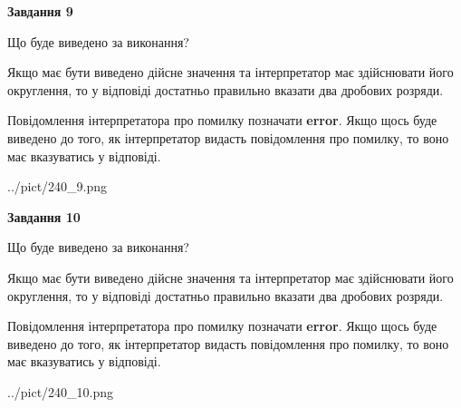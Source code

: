 \documentclass[12pt, ukrainian]{article}
\begin{document}
{\begin {Large}
{\begin {center}\textbf{Завдання 9}\end {center}}\par
Що буде виведено за виконання? \par

Якщо має бути виведено дійсне значення та інтерпретатор має здійснювати його округлення, 
то у відповіді достатньо правильно вказати два дробових розряди.

Повідомлення інтерпретатора про помилку позначати \textbf{error}.
Якщо щось буде виведено до того, як інтерпретатор видасть повідомлення про помилку, 
то воно має вказуватись у відповіді. \par

\begin{center}
	{../pict/240_9.png}
\end{center}
\newpage

{\begin {center}\textbf{Завдання 10}\end {center}}\par
Що буде виведено за виконання? \par

Якщо має бути виведено дійсне значення та інтерпретатор має здійснювати його округлення, 
то у відповіді достатньо правильно вказати два дробових розряди.

Повідомлення інтерпретатора про помилку позначати \textbf{error}.
Якщо щось буде виведено до того, як інтерпретатор видасть повідомлення про помилку, 
то воно має вказуватись у відповіді. \par

\begin{center}
	{../pict/240_10.png}
\end{center}
\newpage

\end {Large}}
\end{document}
